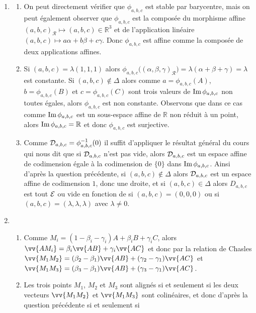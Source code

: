 \documentclass[a4paper,12pt,reqno]{amsart}
\begin{document}
\begin{solution}
\begin{enumerate}
    \item\label{estdroite}
    \begin{enumerate}
      \item On peut directement vérifier que $\phi_{a,b,c}$ est stable par barycentre, mais on peut également observer que $\phi_{a,b,c}$ est la composée du morphisme affine $(a,b,c)_{\mathcal{R}} \mapsto (a,b,c) \in \mathbb{R}^{3}$ et de l'application linéaire $(a,b,c) \mapsto a\alpha + b\beta + c\gamma$. Donc $\phi_{a,b,c}$ est affine comme la composée de deux applications affines.
      \item Si $(a,b,c) = \lambda (1,1,1)$ alors $\phi_{a,b,c}\big((\alpha,\beta,\gamma)_{\mathcal{R}}\big) = \lambda(\alpha+\beta+\gamma) = \lambda$ est constante. Si $(a,b,c) \notin \Delta$ alors comme $a=\phi_{a,b,c}(A)$, $b=\phi_{a,b,c}(B)$ et $c=\phi_{a,b,c}(C)$ sont trois valeurs de $\operatorname{Im} \phi_{a,b,c}$ non toutes égales, alors $\phi_{a,b,c}$ est non constante. Observons que dans ce cas comme $\operatorname{Im} \phi_{a,b,c}$ est un sous-espace affine de $\mathbb{R}$ non réduit à un point, alors $\operatorname{Im} \phi_{a,b,c} = \mathbb{R}$ et donc $\phi_{a,b,c}$ est surjective.
      \item Comme $\mathcal{D}_{a,b,c} = \phi_{a,b,c}^{-1}(0)$ il suffit d'appliquer le résultat général du cours qui nous dit que si $\mathcal{D}_{a,b,c}$ n'est pas vide, alors $\mathcal{D}_{a,b,c}$ est un espace affine de codimension égale à la codimension de $\{0\}$ dans $\operatorname{Im} \phi_{a,b,c}$. Ainsi d'après la question précédente, si $(a,b,c) \notin \Delta$ alors $\mathcal{D}_{a,b,c}$ est un espace affine de codimension $1$, donc une droite, et si $(a,b,c) \in \Delta$ alors $D_{a,b,c}$ est tout $\mathcal{E}$ ou vide en fonction de si $(a,b,c)=(0,0,0)$ ou si $(a,b,c)=(\lambda,\lambda,\lambda)$ avec $\lambda \neq 0$.
    \end{enumerate}
    \item
    \begin{enumerate}
      \item Comme $M_{i} = (1- \beta_{i} - \gamma_{i})A + \beta_{i} B + \gamma_{i} C$, alors $\vv{AM_{i}} =  \beta_{i} \vv{AB} + \gamma_{i} \vv{AC}$ et donc par la relation de Chasles $\vv{M_{1}M_{2}} = (\beta_{2} - \beta_{1}) \vv{AB} + (\gamma_{2} - \gamma_{1}) \vv{AC}$ et $\vv{M_{1}M_{3}} = (\beta_{3} - \beta_{1}) \vv{AB} + (\gamma_{3} - \gamma_{1}) \vv{AC}$.
      \item Les trois points $M_1$, $M_2$ et $M_3$ sont alignés si et seulement si les deux vecteurs $\vv{M_{1}M_{2}}$ et $\vv{M_{1}M_{3}}$ sont colinéaires, et donc d'après la question précédente si et seulement si

\end{enumerate}
\end{enumerate}
\end{solution}
\end{document}
